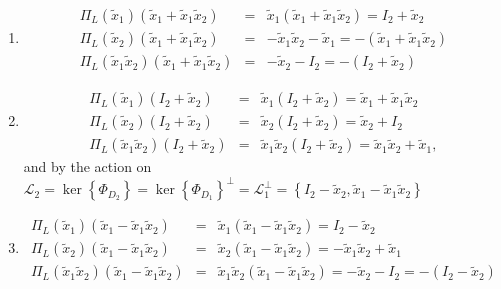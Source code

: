 \documentclass[aps,preprint]{revtex4}
\begin{document}
\begin{enumerate}
\item 
\begin{eqnarray}
\Pi _{L}\left( \widetilde{x}_{1}\right) \left( \widetilde{x}_{1}+\widetilde{x%
}_{1}\widetilde{x}_{2}\right) &=&\widetilde{x}_{1}\left( \widetilde{x}_{1}+%
\widetilde{x}_{1}\widetilde{x}_{2}\right) =I_{2}+\widetilde{x}_{2} \\
\Pi _{L}\left( \widetilde{x}_{2}\right) \left( \widetilde{x}_{1}+\widetilde{x%
}_{1}\widetilde{x}_{2}\right) &=&-\widetilde{x}_{1}\widetilde{x}_{2}-%
\widetilde{x}_{1}=-\left( \widetilde{x}_{1}+\widetilde{x}_{1}\widetilde{x}%
_{2}\right) \\
\Pi _{L}\left( \widetilde{x}_{1}\widetilde{x}_{2}\right) \left( \widetilde{x}%
_{1}+\widetilde{x}_{1}\widetilde{x}_{2}\right) &=&-\widetilde{x}%
_{2}-I_{2}=-\left( I_{2}+\widetilde{x}_{2}\right)
\end{eqnarray}

\item 
\begin{eqnarray}
\Pi _{L}\left( \widetilde{x}_{1}\right) \left( I_{2}+\widetilde{x}%
_{2}\right) &=&\widetilde{x}_{1}\left( I_{2}+\widetilde{x}_{2}\right) =%
\widetilde{x}_{1}+\widetilde{x}_{1}\widetilde{x}_{2} \\
\Pi _{L}\left( \widetilde{x}_{2}\right) \left( I_{2}+\widetilde{x}%
_{2}\right) &=&\widetilde{x}_{2}\left( I_{2}+\widetilde{x}_{2}\right) =%
\widetilde{x}_{2}+I_{2} \\
\Pi _{L}\left( \widetilde{x}_{1}\widetilde{x}_{2}\right) \left( I_{2}+%
\widetilde{x}_{2}\right) &=&\widetilde{x}_{1}\widetilde{x}_{2}\left( I_{2}+%
\widetilde{x}_{2}\right) =\widetilde{x}_{1}\widetilde{x}_{2}+\widetilde{x}%
_{1},
\end{eqnarray}%
and by the action on $\mathcal{L}_{2}=\ker \left\{ \Phi _{D_{2}}\right\}
=\ker \left\{ \Phi _{D_{1}}\right\} ^{\bot }=\mathcal{L}_{1}^{\bot }=\left\{
I_{2}-\widetilde{x}_{2},\widetilde{x}_{1}-\widetilde{x}_{1}\widetilde{x}%
_{2}\right\} $

\item 
\begin{eqnarray}
\Pi _{L}\left( \widetilde{x}_{1}\right) \left( \widetilde{x}_{1}-\widetilde{x%
}_{1}\widetilde{x}_{2}\right) &=&\widetilde{x}_{1}\left( \widetilde{x}_{1}-%
\widetilde{x}_{1}\widetilde{x}_{2}\right) =I_{2}-\widetilde{x}_{2} \\
\Pi _{L}\left( \widetilde{x}_{2}\right) \left( \widetilde{x}_{1}-\widetilde{x%
}_{1}\widetilde{x}_{2}\right) &=&\widetilde{x}_{2}\left( \widetilde{x}_{1}-%
\widetilde{x}_{1}\widetilde{x}_{2}\right) =-\widetilde{x}_{1}\widetilde{x}%
_{2}+\widetilde{x}_{1} \\
\Pi _{L}\left( \widetilde{x}_{1}\widetilde{x}_{2}\right) \left( \widetilde{x}%
_{1}-\widetilde{x}_{1}\widetilde{x}_{2}\right) &=&\widetilde{x}_{1}%
\widetilde{x}_{2}\left( \widetilde{x}_{1}-\widetilde{x}_{1}\widetilde{x}%
_{2}\right) =-\widetilde{x}_{2}-I_{2}=-\left( I_{2}-\widetilde{x}_{2}\right)
\end{eqnarray}


\end{enumerate}
\end{document}
